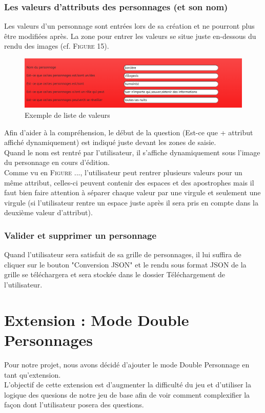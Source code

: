 \documentclass{article}
\begin{document}
            \subsubsection{Les valeurs d'attributs des personnages (et son nom)}
                Les valeurs d'un personnage sont entrées lors de sa création et ne pourront plus être modifiées après. La zone pour entrer les valeurs se situe juste en-dessous du rendu des images (cf. \textsc{Figure 15}).\\
                \begin{figure}[h]
                    \centering \includegraphics[width=12cm]{images/exempleValeurs.PNG}
                    \caption{Exemple de liste de valeurs}
                \end{figure}
                
                Afin d'aider à la compréhension, le début de la question (\textsf{Est-ce que} + attribut affiché dynamiquement) est indiqué juste devant les zones de saisie.\\
                Quand le nom est rentré par l'utilisateur, il s'affiche dynamiquement sous l'image du personnage en cours d'édition.\\
                Comme vu en \textsc{Figure} ..., l'utilisateur peut rentrer plusieurs valeurs pour un même attribut, celles-ci peuvent contenir des espaces et des apostrophes mais il faut bien faire attention à séparer chaque valeur par une virgule et seulement une virgule (si l'utilisateur rentre un espace juste après il sera pris en compte dans la deuxième valeur d'attribut).
                
            \subsubsection{Valider et supprimer un personnage}
                Quand l'utilisateur sera satisfait de sa grille de personnages, il lui suffira de cliquer sur le bouton "Conversion JSON" et le rendu sous format JSON de la grille se téléchargera et sera stockée dans le dossier Téléchargement de l'utilisateur.
            \pagebreak


    \section{Extension : Mode Double Personnages}
        {\large Pour notre projet, nous avons décidé d'ajouter le mode \textsf{Double Personnage} en tant qu'extension.}\\
        L'objectif de cette extension est  d'augmenter la difficulté du jeu et d'utiliser la logique des quesions de notre jeu de base afin de voir comment complexifier la façon dont l'utilisateur posera des questions.\\
        
\end{document}
